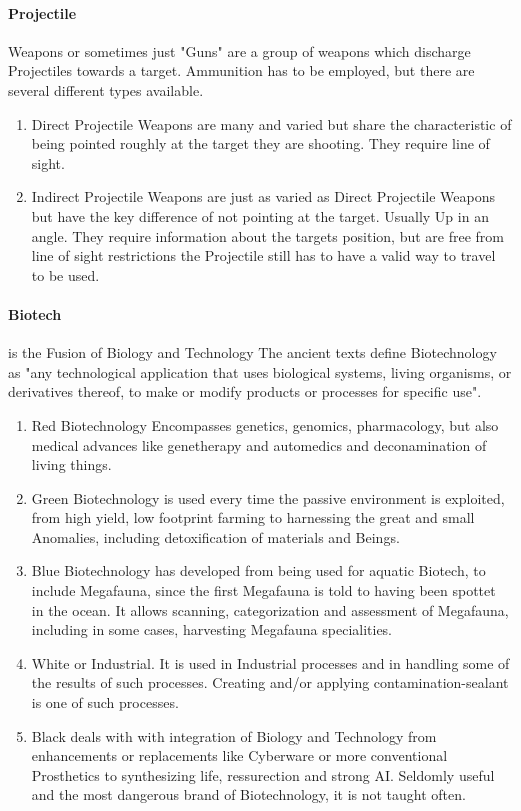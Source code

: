 \documentclass{article}
\begin{document}
        \paragraph{Projectile} Weapons or sometimes just "Guns" \newline are a group of weapons which discharge Projectiles
        towards a target. Ammunition has to be employed, but there are several different types available.
        \begin{enumerate}[label= -]
            \item{Direct} Projectile Weapons are many and varied but share the characteristic of being pointed roughly at
            the target they are shooting. They require line of sight.
            \item{Indirect} Projectile Weapons are just as varied as Direct Projectile Weapons but have the key difference
            of not pointing at the target. Usually Up in an angle. They require information about the targets position,
            but are free from line of sight restrictions the Projectile still has to have a valid way to travel to be used.
        \end{enumerate}
        \paragraph{Biotech} is the Fusion of Biology and Technology \newline The ancient texts define Biotechnology as
        "any technological application that uses biological systems, living organisms, or derivatives thereof, to make
        or modify products or processes for specific use".
        \begin{enumerate}[label= -]
            \item{Red} Biotechnology Encompasses genetics, genomics, pharmacology, but also medical advances like
            genetherapy and automedics and deconamination of living things.
            \item{Green} Biotechnology is used every time the passive environment is exploited, from high yield,
            low footprint farming to harnessing the great and small Anomalies, including detoxification of materials and
            Beings.
            \item{Blue} Biotechnology has developed from being used for aquatic Biotech, to include Megafauna, since the
            first Megafauna is told to having been spottet in the ocean. It allows scanning, categorization and
            assessment of Megafauna, including in some cases, harvesting Megafauna specialities.
            \item{White} or Industrial. It is used in Industrial processes and in handling some of the results of such
            processes. Creating and/or applying contamination-sealant is one of such processes.
            \item{Black} deals with with integration of Biology and Technology from enhancements or replacements like
            Cyberware or more conventional Prosthetics to synthesizing life, ressurection and strong AI. Seldomly useful
            and the most dangerous brand of Biotechnology, it is not taught often.
        \end{enumerate}
    \pagebreak
\end{document}
